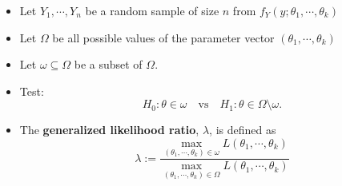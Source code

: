 \begin{frame}
\begin{itemize}
	\item Let $Y_1,\cdots,Y_n$ be a random sample of size $n$ from $f_Y(y;\theta_1,\cdots,\theta_k)$\\[1em]
	\item Let $\Omega$ be all possible values of the parameter vector $(\theta_1,\cdots,\theta_k)$\\[1em]
	\item Let $\omega\subseteq \Omega$ be a subset of $\Omega$.
		\vfill
	\item Test:
		\[
			H_0: \theta\in\omega\quad\text{vs}\quad
			H_1: \theta\in\Omega\setminus\omega.
		\]
		\vfill
	\item The \textcolor{yellow!80!black}{\bf generalized likelihood ratio}, $\lambda$, is defined as
		\[
			\lambda := \frac{\displaystyle \max_{(\theta_1,\cdots,\theta_k)\in\omega} L(\theta_1,\cdots,\theta_k)}{\displaystyle \max_{(\theta_1,\cdots,\theta_k)\in \Omega}L(\theta_1,\cdots,\theta_k)}
		\]
\end{itemize}
\end{frame}

